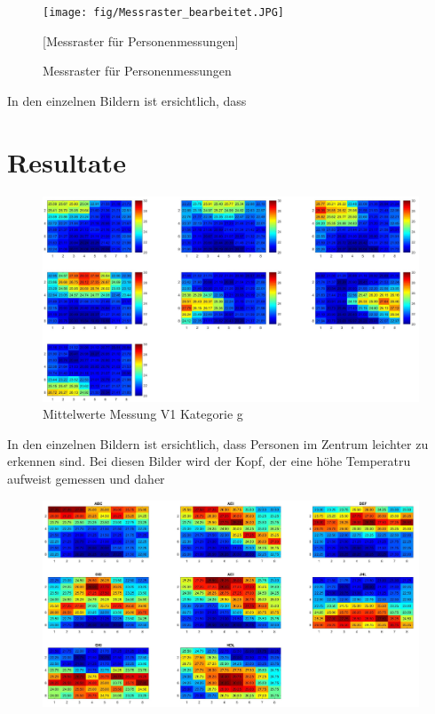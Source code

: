 \begin{figure}[H]
	\centering
	\texttt{[image: fig/Messraster\_bearbeitet.JPG]}
	\caption{Messraster für Personenmessungen}[Messraster für Personenmessungen]
	\label{fig:Messraster}
\end{figure}

In den einzelnen Bildern ist ersichtlich, dass 

\section{Resultate}


\begin{figure}[H]
	\centering
	\includegraphics[width=1.0\textwidth]{fig/p1_g_Allpositions_mean}
	\caption[Mittelwerte Messung V1 Kategorie g]{Mittelwerte Messung V1 Kategorie g}
	\label{fig:p1gallpositionsmean}
\end{figure}

In den einzelnen Bildern ist ersichtlich, dass Personen im Zentrum leichter zu erkennen sind. Bei diesen Bilder wird der Kopf, der eine höhe Temperatru aufweist gemessen und daher


\begin{figure}
	\centering
	\includegraphics[width=1.0\linewidth]{fig/p3_3x3_allpositons}
	\caption{}
	\label{fig:p33x3allpositons}
\end{figure}








